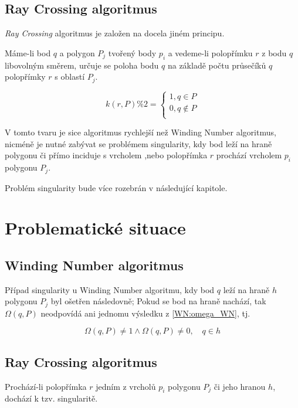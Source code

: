 \documentclass[11pt]{article}
\begin{document}
\subsection{Ray Crossing algoritmus}
\textit {Ray Crossing} algoritmus je založen na docela jiném principu. 

Máme-li bod $q$ a polygon ${P_{j}}$ tvořený body ${p_{i}}$ a  vedeme-li polopřímku $r$ z bodu $q$ libovolným směrem, určuje se poloha bodu $q$ na základě počtu průsečíků $q$ polopřímky $r$ s oblastí ${P_{j}}$.

\begin{equation}
k(r, P) \% 2= \left\{\begin{array}{l}
1, q \in P \\ 
0, q \notin P \\
\end{array} \right.
\label{RC:k}
\end{equation}

V tomto tvaru je sice algoritmus rychlejší než Winding Number algoritmus, nicméně je nutné zabývat se problémem singularity, kdy bod leží na hraně polygonu či přímo inciduje s vrcholem ,nebo polopřímka $r$ prochází vrcholem ${p_{i}}$ polygonu ${P_{j}}$.

Problém singularity bude více rozebrán v následující kapitole.


\section{Problematické situace}

\subsection{Winding Number algoritmus}
Případ singularity u Winding Number algoritmu, kdy bod $q$ leží na hraně $h$ polygonu ${P_{j}}$ byl ošetřen následovně; Pokud se bod na hraně nachází, tak $\Omega(q, P)$ neodpovídá ani jednomu výsledku z \ref{WN:omega_WN}, tj. 

\begin{equation}
\Omega(q, P) \neq 1 \wedge \Omega(q, P) \neq 0, \quad q \in h
\end{equation}


\subsection{Ray Crossing algoritmus}
Prochází-li polopřímka $r$ jedním z vrcholů ${p_{i}}$ polygonu ${P_{j}}$ či jeho hranou $h$, dochází k tzv. singularitě.
\end{document}
